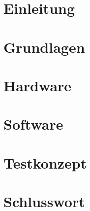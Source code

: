 \documentclass[10pt,a4paper,oneside]{99_fhnwreport}
\begin{document}
\begin{otherlanguage}{ngerman}
\setcounter{page}{1}

\section{Einleitung}\label{sec:einleitung}

\clearpage 

\section{Grundlagen}\label{sec:Grundlagen}

\clearpage

\section{Hardware}\label{sec:hardware}

\clearpage

\section{Software}\label{sec:software}

\clearpage

\section{Testkonzept}\label{sec:testkonzept}

\clearpage

\section{Schlusswort}\label{sec:schlusswort}

\clearpage


\end{otherlanguage}
\end{document}
